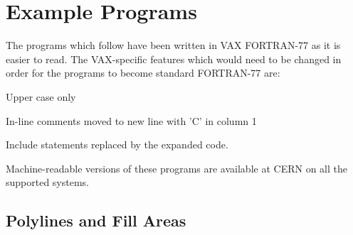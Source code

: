  
\chapter{\protect\label{sec:exmpref}Example Programs}
 
The programs which follow have been written in VAX FORTRAN-77
as it is easier to read.
The VAX-specific features which would need to be changed
in order for the programs to become standard FORTRAN-77 are:
\begin{OL}
\item Upper case only
\item In-line comments moved to new line with 'C' in column 1
\item Include statements replaced by the expanded code.
\end{OL}
 
Machine-readable versions of these programs are available at CERN on all
the supported systems.
\section{\protect\label{sec:expfa}Polylines and Fill Areas}
 
